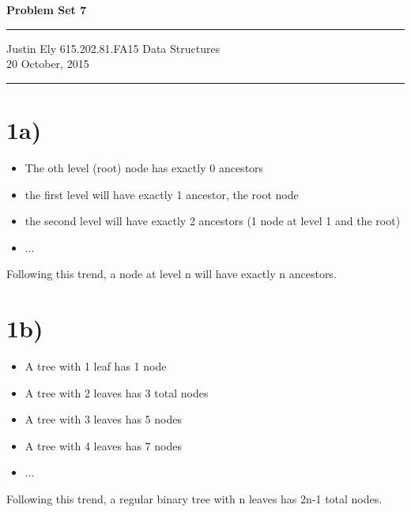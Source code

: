 \documentclass[a4paper,11pt]{article}
\begin{document}
\begin{flushright}

\vspace{1.1cm}

{\bf\Huge Problem Set 7}

\rule{0.25\linewidth}{0.5pt}

\vspace{0.5cm}
Justin Ely
\linebreak
\newline
\footnotesize{615.202.81.FA15 Data Structures \\}
\vspace{0.5cm}
20 October, 2015
\end{flushright}

\noindent\rule{\linewidth}{1.0pt}


\section*{1a)}
\begin{itemize}
    \item The oth level (root) node has exactly 0 ancestors
    \item the first level will have exactly 1 ancestor, the root node
    \item the second level will have exactly 2 ancestors (1 node at level 1 and the root)
    \item ...
\end{itemize}

Following this trend, a node at level n will have exactly n ancestors.  

\section*{1b)}
\begin{itemize}
    \item A tree with 1 leaf has 1 node
    \item A tree with 2 leaves has 3 total nodes
    \item A tree with 3 leaves has 5 nodes
    \item A tree with 4 leaves has 7 nodes
    \item ...
\end{itemize}

Following this trend, a regular binary tree with n leaves has 2n-1 total nodes.
\end{document}

